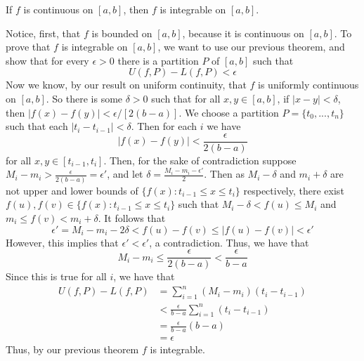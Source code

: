 \documentclass[12pt]{report}
\begin{document}
\begin{thm}{}{}
    If $f$ is continuous on $[a,b]$, then $f$ is integrable on $[a,b]$.
\end{thm}
\begin{proof*}{}{}
    Notice, first, that $f$ is bounded on $[a,b]$, because it is continuous on $[a,b]$. To prove that $f$ is integrable on $[a,b]$, we want to use our previous theorem, and show that for every $\epsilon > 0$ there is a partition $P$ of $[a,b]$ such that \begin{equation*}
        U(f,P) - L(f,P) < \epsilon
    \end{equation*}
    Now we know, by our result on uniform continuity, that $f$ is uniformly continuous on $[a,b]$. So there is some $\delta > 0$ such that for all $x,y \in [a,b]$, if $|x-y| < \delta$, then $|f(x) - f(y)| < \epsilon/[2(b-a)]$. We choose a partition $P = \{t_0,...,t_n\}$ such that each $|t_i-t_{i-1}| < \delta$. Then for each $i$ we have \begin{equation*}
        |f(x) - f(y)| < \frac{\epsilon}{2(b-a)}
    \end{equation*}
    for all $x,y \in [t_{i-1},t_i]$. Then, for the sake of contradiction suppose $M_i - m_i > \frac{\epsilon}{2(b-a)} = \epsilon'$, and let $\delta = \frac{M_i-m_i - \epsilon'}{2}$. Then as $M_i - \delta$ and $m_i + \delta$ are not upper and lower bounds of $\{f(x):t_{i-1} \leq x \leq t_i\}$ respectively, there exist $f(u),f(v) \in \{f(x):t_{i-1} \leq x \leq t_i\}$ such that $M_i - \delta < f(u) \leq M_i$ and $m_i \leq f(v) < m_i+\delta$. It follows that \begin{equation*}
        \epsilon'=M_i-m_i-2\delta < f(u) - f(v) \leq |f(u) - f(v)| < \epsilon'
    \end{equation*}
    However, this implies that $\epsilon' < \epsilon'$, a contradiction. Thus, we have that \begin{equation*}
        M_i - m_i \leq \frac{\epsilon}{2(b-a)} < \frac{\epsilon}{b-a}
    \end{equation*}
    Since this is true for all $i$, we have that \begin{align*}
        U(f,P) - L(f,P) &= \sum_{i=1}^n(M_i-m_i)(t_i-t_{i-1}) \\
        &< \frac{\epsilon}{b-a}\sum_{i=1}^n(t_i-t_{i-1}) \\
        &= \frac{\epsilon}{b-a}(b-a) \\
        &= \epsilon
    \end{align*}
    Thus, by our previous theorem $f$ is integrable.
\end{proof*}
\end{document}
